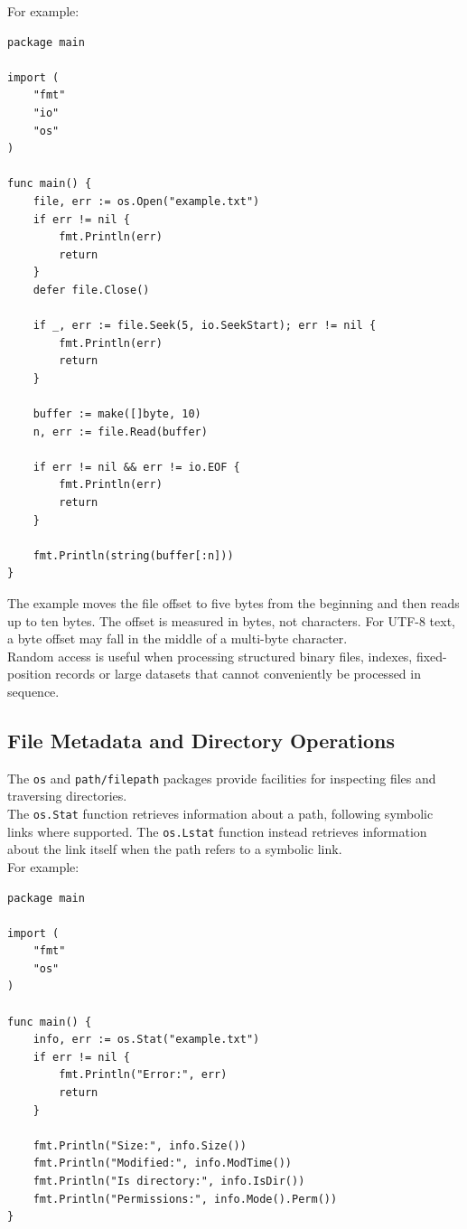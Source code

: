 For example:

\begin{lstlisting}
package main

import (
    "fmt"
    "io"
    "os"
)

func main() {
    file, err := os.Open("example.txt")
    if err != nil {
        fmt.Println(err)
        return
    }
    defer file.Close()

    if _, err := file.Seek(5, io.SeekStart); err != nil {
        fmt.Println(err)
        return
    }

    buffer := make([]byte, 10)
    n, err := file.Read(buffer)

    if err != nil && err != io.EOF {
        fmt.Println(err)
        return
    }

    fmt.Println(string(buffer[:n]))
}
\end{lstlisting}

The example moves the file offset to five bytes from the beginning and then reads up to ten bytes. The offset is measured in bytes, not characters. For UTF-8 text, a byte offset may fall in the middle of a multi-byte character.\\

Random access is useful when processing structured binary files, indexes, fixed-position records or large datasets that cannot conveniently be processed in sequence.\\

\subsection{File Metadata and Directory Operations}

The \texttt{os} and \texttt{path/filepath} packages provide facilities for inspecting files and traversing directories.\\

The \texttt{os.Stat} function retrieves information about a path, following symbolic links where supported. The \texttt{os.Lstat} function instead retrieves information about the link itself when the path refers to a symbolic link.\\

For example:

\begin{lstlisting}
package main

import (
    "fmt"
    "os"
)

func main() {
    info, err := os.Stat("example.txt")
    if err != nil {
        fmt.Println("Error:", err)
        return
    }

    fmt.Println("Size:", info.Size())
    fmt.Println("Modified:", info.ModTime())
    fmt.Println("Is directory:", info.IsDir())
    fmt.Println("Permissions:", info.Mode().Perm())
}
\end{lstlisting}

